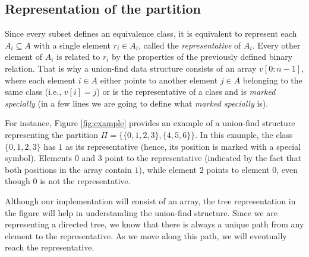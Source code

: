 \subsection{Representation of the partition}
Since every subset defines an equivalence class, it is equivalent to represent each \( A_i \subseteq A \) with a single element \( r_i \in A_i \), called the \textit{representative} of \( A_i \). Every other element of \( A_i \) is related to \( r_i \) by the properties of the previously defined binary relation.  That is why a union-find data structure consists of an array \( v[0:n-1] \), where each element \( i \in A \) either points to another element \( j \in A \) belonging to the same class (i.e., \( v[i] = j \)) or is the representative of a class and is \textit{marked specially} (in a few lines we are going to define what \textit{marked specially} is).  

For instance, Figure \ref{fig:example} provides an example of a union-find structure representing the partition \( \Pi = \{ \{0,1,2,3\}, \{4,5,6\} \} \). In this example, the class \( \{0,1,2,3\} \) has \( 1 \) as its representative (hence, its position is marked with a special symbol). Elements \( 0 \) and \( 3 \) point to the representative (indicated by the fact that both positions in the array contain \( 1 \)), while element \( 2 \) points to element \( 0 \), even though \( 0 \) is not the representative.  

Although our implementation will consist of an array, the tree representation in the figure will help in understanding the union-find structure. Since we are representing a directed tree, we know that there is always a unique path from any element to the representative. As we move along this path, we will eventually reach the representative.

